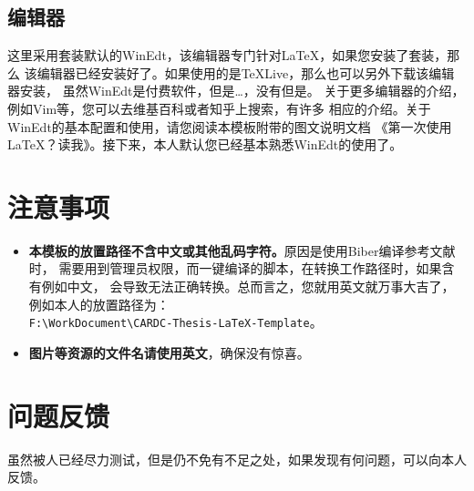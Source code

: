\subsection{编辑器}
这里采用\CTeX 套装默认的WinEdt，该编辑器专门针对\LaTeX，如果您安装了\CTeX 套装，那么%
该编辑器已经安装好了。如果使用的是TeXLive，那么也可以另外下载该编辑器安装，%
虽然WinEdt是付费软件，但是\dots，没有但是。%
关于更多编辑器的介绍，例如Vim等，您可以去维基百科或者知乎上搜索，有许多%
相应的介绍。关于WinEdt的基本配置和使用，请您阅读本模板附带的图文说明文档%
《第一次使用LaTeX？读我》。接下来，本人默认您已经基本熟悉WinEdt的使用了。


\section{注意事项}
\begin{itemize}
  \item \textbf{本模板的放置路径不含中文或其他乱码字符。}原因是使用Biber编译参考文献时，%
  需要用到管理员权限，而一键编译的脚本，在转换工作路径时，如果含有例如中文，%
  会导致无法正确转换。总而言之，您就用英文就万事大吉了，例如本人的放置路径为：\\
  \verb"F:\WorkDocument\CARDC-Thesis-LaTeX-Template"。

  \item \textbf{图片等资源的文件名请使用英文}，确保没有惊喜。
\end{itemize}

\section{问题反馈}
虽然被人已经尽力测试，但是仍不免有不足之处，如果发现有何问题，可以向本人反馈。
